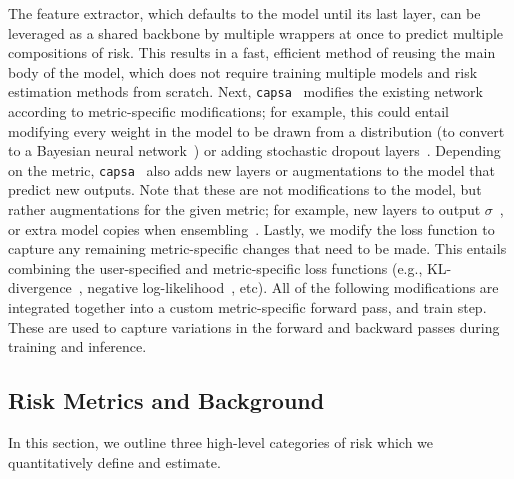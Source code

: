 \documentclass{article} %
\def\capsa{\texttt{{capsa}}}
\newcommand{\todo}[1]{\textcolor{red}{[\textbf{TODO}: #1]}}
\begin{document}
The feature extractor, which defaults to the model until its last layer, can be leveraged as a shared backbone by multiple wrappers at once to predict multiple compositions of risk. This results in a fast, efficient method of reusing the main body of the model, which does not require training multiple models and risk estimation methods from scratch. Next, \capsa~ modifies the existing network according to metric-specific modifications; for example, this could entail modifying every weight in the model to be drawn from a distribution (to convert to a Bayesian neural network~\citep{blundell2015weight}) or adding stochastic dropout layers~\citep{gal2016dropout}. Depending on the metric, \capsa~ also adds new layers or augmentations to the model that predict new outputs. Note that these are not modifications to the model, but rather augmentations for the given metric; for example, new layers to output $\sigma$~\citep{nix1994estimating}, or extra model copies when ensembling~\citep{lakshminarayanan2017simple}. Lastly, we modify the loss function to capture any remaining metric-specific changes that need to be made. This entails combining the user-specified and metric-specific loss functions (e.g., KL-divergence~\citep{kingma2013auto}, negative log-likelihood~\citep{nix1994estimating}, etc). All of the following modifications are integrated together into a custom metric-specific forward pass, and train step. These are used to capture variations in the forward and backward passes during training and inference. 

\subsection{Risk Metrics and Background}
In this section, we outline three high-level categories of risk which we quantitatively define and estimate.
\end{document}
